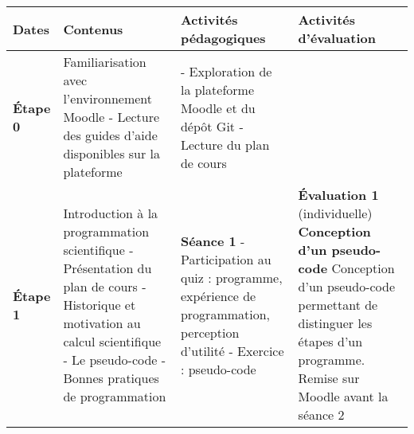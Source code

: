 \documentclass[12]{article}
\begin{document}
	\begin{center}
        \begin{tabular}{| p{0.1\linewidth} | p{0.3\linewidth} | p{0.3\linewidth} | p{0.3\linewidth} | } 
        \hline
        Dates & Contenus & Activités pédagogiques & Activités d'évaluation \\ [0.5ex] 
        \hline\hline
        \textbf{Étape 0} &
        Familiarisation avec l'environnement Moodle\hfill\hfill \linebreak\linebreak 
        	- Lecture des guides d’aide disponibles sur la plateforme\hfill\hfill &
        - Exploration de la plateforme Moodle et du dépôt Git\hfill\hfill \linebreak
        - Lecture du plan de cours\hfill\hfill \linebreak &
         \hfill\hfill\hfill \\
         \hline
         \textbf{Étape 1} &
        Introduction à la programmation scientifique\hfill\hfill \linebreak\linebreak
            - Présentation du plan de cours\hfill \linebreak
			- Historique et motivation au calcul scientifique\hfill\hfill \linebreak
        	- Le pseudo-code\hfill\hfill \linebreak
    		- Bonnes pratiques de programmation\hfill\hfill & 
        \textbf{Séance 1} \linebreak
        - Participation au quiz : programme, expérience de programmation, perception d'utilité\hfill\hfill\hfill \linebreak
        - Exercice : pseudo-code\hfill\hfill\hfill \linebreak & 
        \textbf{Évaluation 1} (individuelle) \linebreak
        \textbf{Conception d'un pseudo-code}\hfill\hfill \linebreak
        Conception d'un pseudo-code permettant de distinguer les étapes d'un programme. Remise sur Moodle avant la séance 2 \hfill\hfill \\
        \hline

\end{tabular}
\end{center}
\end{document}
